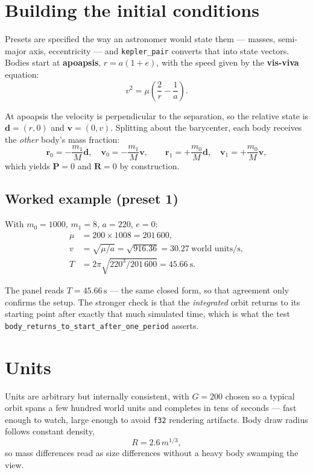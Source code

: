 \documentclass[11pt,a4paper]{article}
\newcommand{\vd}{\mathbf{d}}
\newcommand{\vr}{\mathbf{r}}
\newcommand{\vv}{\mathbf{v}}
\newcommand{\vP}{\mathbf{P}}
\newcommand{\vR}{\mathbf{R}}
\begin{document}
\section{Building the initial conditions}

Presets are specified the way an astronomer would state them --- masses,
semi-major axis, eccentricity --- and \texttt{kepler\_pair} converts that into
state vectors. Bodies start at \textbf{apoapsis}, $r = a(1+e)$, with the speed
given by the \textbf{vis-viva} equation:
\[
  v^{2} = \mu\left(\frac{2}{r} - \frac{1}{a}\right).
\]

At apoapsis the velocity is perpendicular to the separation, so the relative
state is $\vd = (r, 0)$ and $\vv = (0, v)$. Splitting about the barycenter, each
body receives the \emph{other} body's mass fraction:
\[
  \vr_0 = -\frac{m_1}{M}\vd, \quad \vv_0 = -\frac{m_1}{M}\vv,
  \qquad
  \vr_1 = +\frac{m_0}{M}\vd, \quad \vv_1 = +\frac{m_0}{M}\vv,
\]
which yields $\vP = 0$ and $\vR = 0$ by construction.

\subsection*{Worked example (preset 1)}

With $m_0 = 1000$, $m_1 = 8$, $a = 220$, $e = 0$:
\begin{align*}
  \mu &= 200 \times 1008 = 201\,600,\\
  v   &= \sqrt{\mu/a} = \sqrt{916.36} = 30.27 \ \text{world units/s},\\
  T   &= 2\pi\sqrt{220^{3}/201\,600} = 45.66\ \mathrm{s}.
\end{align*}

The panel reads $T = 45.66\,\mathrm{s}$ --- the same closed form, so that
agreement only confirms the setup. The stronger check is that the
\emph{integrated} orbit returns to its starting point after exactly that much
simulated time, which is what the test
\texttt{body\_returns\_to\_start\_after\_one\_period} asserts.

\section{Units}

Units are arbitrary but internally consistent, with $G = 200$ chosen so a
typical orbit spans a few hundred world units and completes in tens of seconds
--- fast enough to watch, large enough to avoid \texttt{f32} rendering
artifacts. Body draw radius follows constant density,
\[
  R = 2.6 \, m^{1/3},
\]
so mass differences read as size differences without a heavy body swamping the
view.
\end{document}
